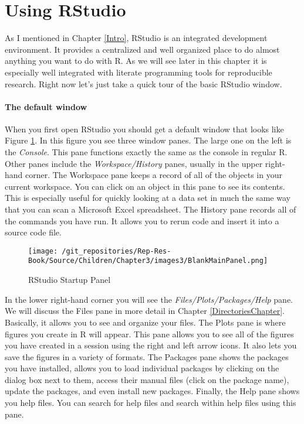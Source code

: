 \documentclass[ChapterTOCs,krantz1]{krantz}\usepackage{graphicx, color}
\begin{document}
{%
\section{Using RStudio}

As I mentioned in Chapter \ref{Intro}, RStudio is an integrated development environment. It provides a centralized and well organized place to do almost anything you want to do with R. As we will see later in this chapter it is especially well integrated with literate programming tools for reproducible research. Right now let's just take a quick tour of the basic RStudio window.

\paragraph{The default window}

When you first open RStudio you should get a default window that looks like Figure \ref{BlankMain}. In this figure you see three window panes. The large one on the left is the {\emph{Console}}. This pane functions exactly the same as the console in regular R. Other panes include the {\emph{Workspace/History}} panes, usually in the upper right-hand corner. The Workspace pane keeps a record of all of the objects in your current workspace. You can click on an object in this pane to see its contents. This is especially useful for quickly looking at a data set in much the same way that you can scan a Microsoft Excel spreadsheet. The History pane records all of the commands you have run. It allows you to rerun code and insert it into a source code file.

\begin{figure}[ht]

    \caption{RStudio Startup Panel}
    \label{BlankMain}
    \begin{center}
    \texttt{[image: /git\_repositories/Rep-Res-Book/Source/Children/Chapter3/images3/BlankMainPanel.png]}
    \end{center}
\end{figure}

In the lower right-hand corner you will see the {\emph{Files/Plots/Packages/Help}} pane. We will discuss the Files pane in more detail in Chapter \ref{DirectoriesChapter}. Basically, it allows you to see and organize your files. The Plots pane is where figures you create in R will appear. This pane allows you to see all of the figures you have created in a session using the right and left arrow icons. It also lets you save the figures in a variety of formats. The Packages pane shows the packages you have installed, allows you to load individual packages by clicking on the dialog box next to them, access their manual files (click on the package name), update the packages, and even install new packages. Finally, the Help pane shows you help files. You can search for help files and search within help files using this pane.  

}
\end{document}
